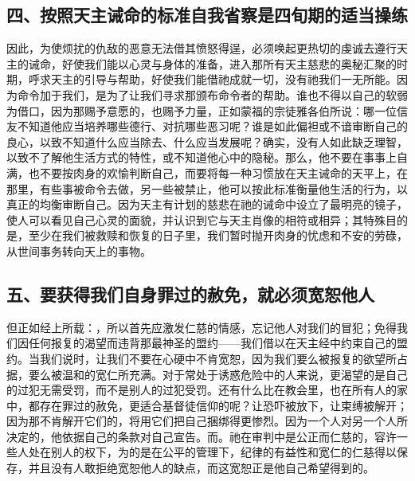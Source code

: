 
\subsection{四、按照天主诫命的标准自我省察是四旬期的适当操练}

因此，为使烦扰的仇敌的恶意无法借其愤怒得逞，必须唤起更热切的虔诚去遵行天主的诫命，好使我们能以心灵与身体的准备，进入那所有天主慈悲的奥秘汇聚的时期，呼求天主的引导与帮助，好使我们能借祂成就一切，没有祂我们一无所能。因为命令加于我们，是为了让我们寻求那颁布命令者的帮助。谁也不得以自己的软弱为借口，因为那赐予意愿的，也赐予力量，正如蒙福的宗徒雅各伯所说：哪一位信友不知道他应当培养哪些德行、对抗哪些恶习呢？谁是如此偏袒或不谙审断自己的良心，以致不知道什么应当除去、什么应当发展呢？确实，没有人如此缺乏理智，以致不了解他生活方式的特性，或不知道他心中的隐秘。那么，他不要在事事上自满，也不要按肉身的欢愉判断自己，而要将每一种习惯放在天主诫命的天平上，在那里，有些事被命令去做，另一些被禁止，他可以按此标准衡量他生活的行为，以真正的均衡审断自己。因为天主有计划的慈悲在祂的诫命中设立了最明亮的镜子，使人可以看见自己心灵的面貌，并认识到它与天主肖像的相符或相异；其特殊目的是，至少在我们被救赎和恢复的日子里，我们暂时抛开肉身的忧虑和不安的劳碌，从世间事务转向天上的事物。\par


\subsection{五、要获得我们自身罪过的赦免，就必须宽恕他人}

但正如经上所载：，所以首先应激发仁慈的情感，忘记他人对我们的冒犯；免得我们因任何报复的渴望而违背那最神圣的盟约——我们借以在天主经中约束自己的盟约。当我们说时，让我们不要在心硬中不肯宽恕，因为我们要么被报复的欲望所占据，要么被温和的宽仁所充满。对于常处于诱惑危险中的人来说，更渴望的是自己的过犯无需受罚，而不是别人的过犯受罚。还有什么比在教会里，也在所有人的家中，都存在罪过的赦免，更适合基督徒信仰的呢？让恐吓被放下，让束缚被解开；因为那不肯解开它们的，将用它们把自己捆绑得更惨烈。因为一个人对另一个人所决定的，他依据自己的条款对自己宣告。而。祂在审判中是公正而仁慈的，容许一些人处在别人的权下，为的是在公平的管理下，纪律的有益性和宽仁的仁慈得以保存，并且没有人敢拒绝宽恕他人的缺点，而这宽恕正是他自己希望得到的。\par

